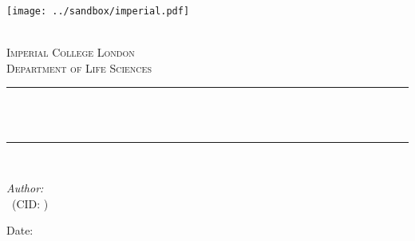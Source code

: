 \begin{titlepage}

    \newcommand{\HRule}{\rule{\linewidth}{0.5mm}} %
    
    
    \texttt{[image: ../sandbox/imperial.pdf]}\\[0.6cm] 
    
    \begin{center} %
    
    \textsc{\LARGE \reporttype}\\[1.5cm] 
    \textsc{\Large Imperial College London}\\[0.5cm] 
    \textsc{\large Department of Life Sciences}\\[0.5cm] 
    
    \HRule \\[0.4cm]
    { \huge \bfseries \reporttitle}\\ %
    \HRule \\[1.5cm]
    \end{center}
    
    \begin{flushleft} \large
    \textit{Author:}\\
    \reportauthor~(CID: \cid) %

    \vspace{2cm}
    \makeatletter
    Date: \@date \\
    \end{flushleft}


    \vfill %
    

    
    \makeatother
    
    


    \end{titlepage}
    
    